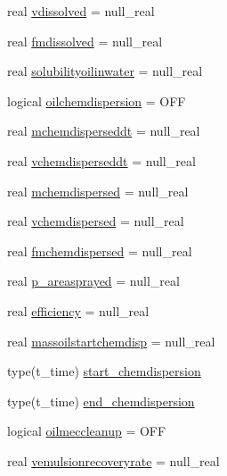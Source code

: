 \begin{DoxyCompactItemize}
\item 
real \mbox{\hyperlink{structmoduleoil__0d_1_1t__var_ac1b2a2e1f5b721b6042f1a02215771a9}{vdissolved}} = null\+\_\+real
\item 
real \mbox{\hyperlink{structmoduleoil__0d_1_1t__var_a98db678f6bbe01ff22a03fb1ae88f007}{fmdissolved}} = null\+\_\+real
\item 
real \mbox{\hyperlink{structmoduleoil__0d_1_1t__var_a2ba71d89d91ae9a72654d44c7dfd4adf}{solubilityoilinwater}} = null\+\_\+real
\item 
logical \mbox{\hyperlink{structmoduleoil__0d_1_1t__var_ab1d8e3defebc021a39437affd6265cc1}{oilchemdispersion}} = O\+FF
\item 
real \mbox{\hyperlink{structmoduleoil__0d_1_1t__var_a2e0bf637a30f076fa0724d76b0ec619b}{mchemdisperseddt}} = null\+\_\+real
\item 
real \mbox{\hyperlink{structmoduleoil__0d_1_1t__var_acb1be430166774814f38736ee548c6b2}{vchemdisperseddt}} = null\+\_\+real
\item 
real \mbox{\hyperlink{structmoduleoil__0d_1_1t__var_af1758e0b29e96ef37a3552eeef6bbd6e}{mchemdispersed}} = null\+\_\+real
\item 
real \mbox{\hyperlink{structmoduleoil__0d_1_1t__var_a105fcf99bb129c4b5afcb143243c230d}{vchemdispersed}} = null\+\_\+real
\item 
real \mbox{\hyperlink{structmoduleoil__0d_1_1t__var_acd01fb2a7c16adda9e600c69e5aecbdb}{fmchemdispersed}} = null\+\_\+real
\item 
real \mbox{\hyperlink{structmoduleoil__0d_1_1t__var_adacf42a070d17551a539ff783640a07d}{p\+\_\+areasprayed}} = null\+\_\+real
\item 
real \mbox{\hyperlink{structmoduleoil__0d_1_1t__var_a449fb7f398b9a5eb0889ef822a25ba62}{efficiency}} = null\+\_\+real
\item 
real \mbox{\hyperlink{structmoduleoil__0d_1_1t__var_ae26b8b7111833da24e1ed3933e108a14}{massoilstartchemdisp}} = null\+\_\+real
\item 
type(t\+\_\+time) \mbox{\hyperlink{structmoduleoil__0d_1_1t__var_aea06e040a2c233f120bed22e265f4a5f}{start\+\_\+chemdispersion}}
\item 
type(t\+\_\+time) \mbox{\hyperlink{structmoduleoil__0d_1_1t__var_a61a4fd0e63ab8fb8267a735560ddb907}{end\+\_\+chemdispersion}}
\item 
logical \mbox{\hyperlink{structmoduleoil__0d_1_1t__var_a1424d8786b88439439c40fd3bb6a8a04}{oilmeccleanup}} = O\+FF
\item 
real \mbox{\hyperlink{structmoduleoil__0d_1_1t__var_a094d95b5ff9a8d48f28f51358ef7dfe6}{vemulsionrecoveryrate}} = null\+\_\+real

\end{DoxyCompactItemize}
